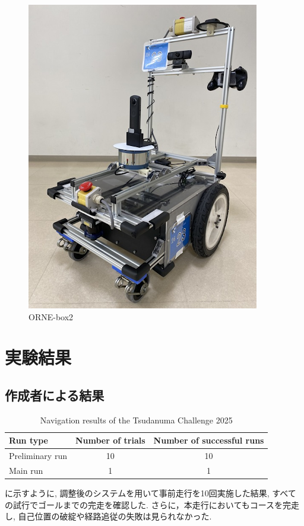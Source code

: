 \begin{figure}[hbtp]
  \centering
 \includegraphics[keepaspectratio, scale=0.3]
      {images/box2.png}
 \caption{ORNE-box2}
 \label{Fig:ORNE-box2}
\end{figure}




\newpage
\section{実験結果}
\subsection{作成者による結果}
\begin{table}[htbp]
  \centering
  \caption{Navigation results of the Tsudanuma Challenge 2025}
  \label{tab:tsudanuma_result}
  \begin{tabular}{lcc}
    \hline
    \textbf{Run type} & \textbf{Number of trials} & \textbf{Number of successful runs} \\
    \hline
    Preliminary run & 10 & 10 \\
    Main run        & 1  & 1  \\
    \hline
  \end{tabular}
\end{table}
に示すように, 調整後のシステムを用いて事前走行を10回実施した結果, すべての試行でゴールまでの完走を確認した. 
さらに，本走行においてもコースを完走し, 自己位置の破綻や経路追従の失敗は見られなかった. 

